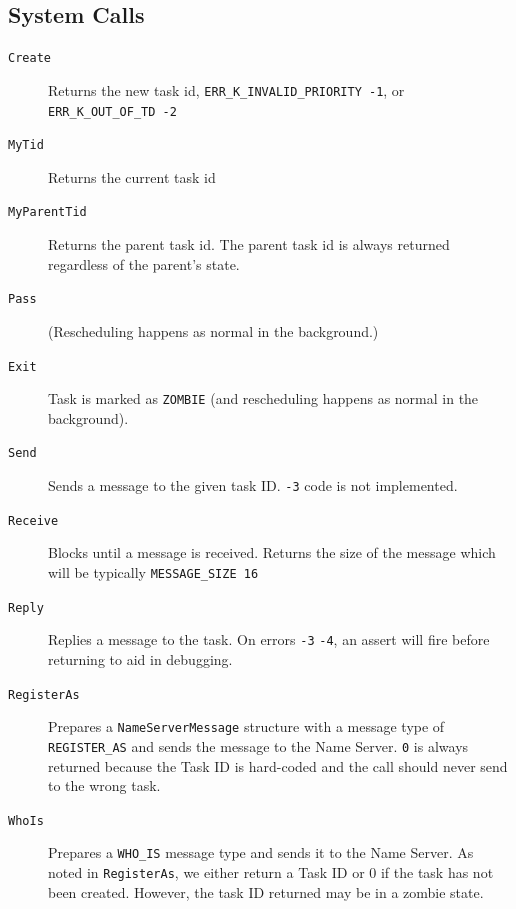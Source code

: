 \documentclass[letterpaper]{article}
\begin{document}
\subsection{System Calls%
  \label{system-calls}%
}
%
\begin{description}
\item[{\texttt{Create}}] \leavevmode 
Returns the new task id, \texttt{ERR\_K\_INVALID\_PRIORITY -1}, or \texttt{ERR\_K\_OUT\_OF\_TD -2}

\item[{\texttt{MyTid}}] \leavevmode 
Returns the current task id

\item[{\texttt{MyParentTid}}] \leavevmode 
Returns the parent task id. The parent task id is always returned regardless of the parent's state.

\item[{\texttt{Pass}}] \leavevmode 
(Rescheduling happens as normal in the background.)

\item[{\texttt{Exit}}] \leavevmode 
Task is marked as \texttt{ZOMBIE} (and rescheduling happens as normal in the background).

\item[{\texttt{Send}}] \leavevmode 
Sends a message to the given task ID. \texttt{-3} code is not implemented.

\item[{\texttt{Receive}}] \leavevmode 
Blocks until a message is received. Returns the size of the message which will be typically \texttt{MESSAGE\_SIZE 16}

\item[{\texttt{Reply}}] \leavevmode 
Replies a message to the task. On errors \texttt{-3} \texttt{-4}, an assert will fire before returning to aid in debugging.

\item[{\texttt{RegisterAs}}] \leavevmode 
Prepares a \texttt{NameServerMessage} structure with a message type of \texttt{REGISTER\_AS} and sends the message to the Name Server. \texttt{0} is always returned because the Task ID is hard-coded and the call should never send to the wrong task.

\item[{\texttt{WhoIs}}] \leavevmode 
Prepares a \texttt{WHO\_IS} message type and sends it to the Name Server. As noted in \texttt{RegisterAs}, we either return a Task ID or 0 if the task has not been created. However, the task ID returned may be in a zombie state.


\end{description}
\end{document}
